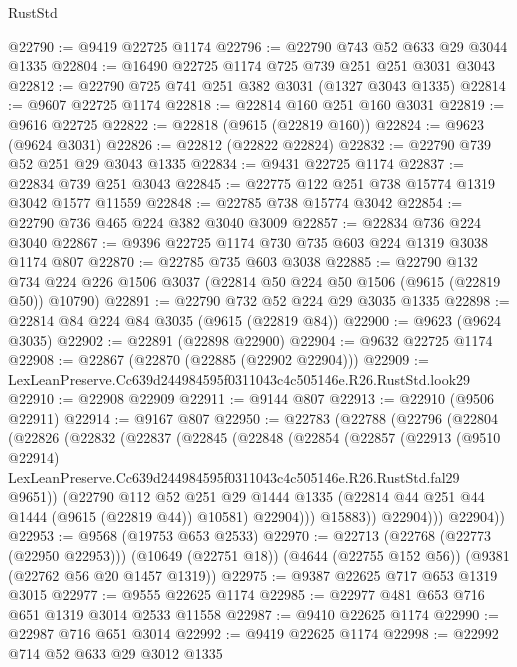 \begin{lexlean}{RustStd}
\begin{coremodule}
@22790 := @9419 @22725 @1174
@22796 := @22790 @743 @52 @633 @29 @3044 @1335
@22804 := @16490 @22725 @1174 @725 @739 @251 @251 @3031 @3043
@22812 := @22790 @725 @741 @251 @382 @3031 (@1327 @3043 @1335)
@22814 := @9607 @22725 @1174
@22818 := @22814 @160 @251 @160 @3031
@22819 := @9616 @22725
@22822 := @22818 (@9615 (@22819 @160))
@22824 := @9623 (@9624 @3031)
@22826 := @22812 (@22822 @22824)
@22832 := @22790 @739 @52 @251 @29 @3043 @1335
@22834 := @9431 @22725 @1174
@22837 := @22834 @739 @251 @3043
@22845 := @22775 @122 @251 @738 @15774 @1319 @3042 @1577 @11559
@22848 := @22785 @738 @15774 @3042
@22854 := @22790 @736 @465 @224 @382 @3040 @3009
@22857 := @22834 @736 @224 @3040
@22867 := @9396 @22725 @1174 @730 @735 @603 @224 @1319 @3038 @1174 @807
@22870 := @22785 @735 @603 @3038
@22885 := @22790
    @132
    @734
    @224
    @226
    @1506
    @3037
    (@22814 @50 @224 @50 @1506 (@9615 (@22819 @50)) @10790)
@22891 := @22790 @732 @52 @224 @29 @3035 @1335
@22898 := @22814 @84 @224 @84 @3035 (@9615 (@22819 @84))
@22900 := @9623 (@9624 @3035)
@22902 := @22891 (@22898 @22900)
@22904 := @9632 @22725 @1174
@22908 := @22867 (@22870 (@22885 (@22902 @22904)))
@22909 := LexLeanPreserve.Cc639d244984595f0311043c4c505146e.R26.RustStd.look29
@22910 := @22908 @22909
@22911 := @9144 @807
@22913 := @22910 (@9506 @22911)
@22914 := @9167 @807
@22950 := @22783
    (@22788
      (@22796
        (@22804
          (@22826
            (@22832
              (@22837
                (@22845
                  (@22848
                    (@22854
                      (@22857
                        (@22913
                          (@9510 @22914)
                          LexLeanPreserve.Cc639d244984595f0311043c4c505146e.R26.RustStd.fal29
                          @9651))
                      (@22790
                        @112
                        @52
                        @251
                        @29
                        @1444
                        @1335
                        (@22814 @44 @251 @44 @1444 (@9615 (@22819 @44)) @10581)
                        @22904)))
                  @15883))
              @22904)))
        @22904))
@22953 := @9568 (@19753 @653 @2533)
@22970 := @22713
    (@22768 (@22773 (@22950 @22953)))
    (@10649 (@22751 @18))
    (@4644 (@22755 @152 @56))
    (@9381 (@22762 @56 @20 @1457 @1319))
@22975 := @9387 @22625 @717 @653 @1319 @3015
@22977 := @9555 @22625 @1174
@22985 := @22977 @481 @653 @716 @651 @1319 @3014 @2533 @11558
@22987 := @9410 @22625 @1174
@22990 := @22987 @716 @651 @3014
@22992 := @9419 @22625 @1174
@22998 := @22992 @714 @52 @633 @29 @3012 @1335

\end{coremodule}
\end{lexlean}
